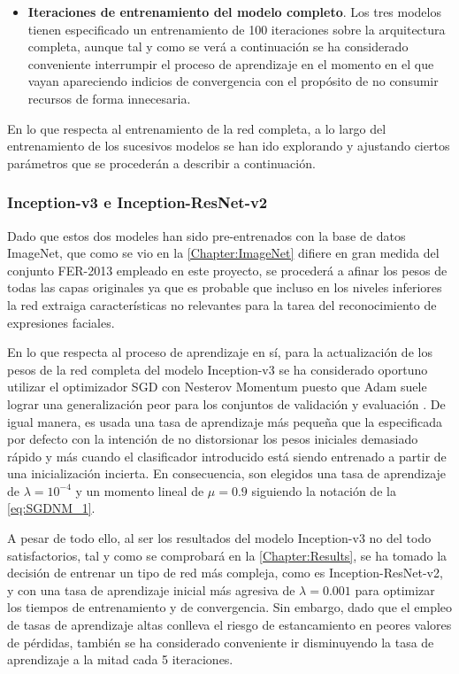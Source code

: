 \begin{itemize}
    \item \textbf{Iteraciones de entrenamiento del modelo completo}. Los tres modelos tienen especificado un entrenamiento de 100 iteraciones sobre la arquitectura completa, aunque tal y como se verá a continuación se ha considerado conveniente interrumpir el proceso de aprendizaje en el momento en el que vayan apareciendo indicios de convergencia con el propósito de no consumir recursos de forma innecesaria.
\end{itemize}

En lo que respecta al entrenamiento de la red completa, a lo largo del entrenamiento de los sucesivos modelos se han ido explorando y ajustando ciertos parámetros que se procederán a describir a continuación.

\subsubsection{Inception-v3 e Inception-ResNet-v2}

Dado que estos dos modeles han sido pre-entrenados con la base de datos ImageNet, que como se vio en la \autoref{Chapter:ImageNet} difiere en gran medida del conjunto FER-2013 empleado en este proyecto, se procederá a afinar los pesos de todas las capas originales ya que es probable que incluso en los niveles inferiores la red extraiga características no relevantes para la tarea del reconocimiento de expresiones faciales.

En lo que respecta al proceso de aprendizaje en sí, para la actualización de los pesos de la red completa del modelo Inception-v3 se ha considerado oportuno utilizar el optimizador SGD con Nesterov Momentum puesto que Adam suele lograr una generalización peor para los conjuntos de validación y evaluación \cite{AdamToSDG}. De igual manera, es usada una tasa de aprendizaje más pequeña que la especificada por defecto con la intención de no distorsionar los pesos iniciales demasiado rápido y más cuando el clasificador introducido está siendo entrenado a partir de una inicialización incierta. En consecuencia, son elegidos una tasa de aprendizaje de $\lambda = 10^{-4}$ y un momento lineal de $\mu = 0.9$ \cite{Sutskever} siguiendo la notación de la \autoref{eq:SGDNM_1}.

A pesar de todo ello, al ser los resultados del modelo Inception-v3 no del todo satisfactorios, tal y como se comprobará en la \autoref{Chapter:Results}, se ha tomado la decisión de entrenar un tipo de red más compleja, como es Inception-ResNet-v2, y con una tasa de aprendizaje inicial más agresiva de $\lambda = 0.001$ para optimizar los tiempos de entrenamiento y de convergencia. Sin embargo, dado que el empleo de tasas de aprendizaje altas conlleva el riesgo de estancamiento en peores valores de pérdidas, también se ha considerado conveniente ir disminuyendo la tasa de aprendizaje a la mitad cada 5 iteraciones.

